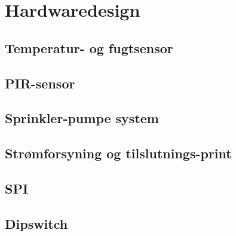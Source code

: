 \chapter{Hardwaredesign}

\section{Temperatur- og fugtsensor}


\section{PIR-sensor}


\section{Sprinkler-pumpe system}


\section{Strømforsyning og tilslutnings-print}


\section{SPI}


\section{Dipswitch}


